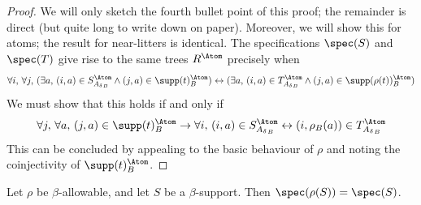 \begin{proof}
  We will only sketch the fourth bullet point of this proof; the remainder is direct (but quite long to write down on paper).
  Moreover, we will show this for atoms; the result for near-litters is identical.
  The specifications \( \spec(S) \) and \( \spec(T) \) give rise to the same trees \( R^\Atom \) precisely when
  \[ \forall i,\, \forall j,\, (\exists a,\, (i, a) \in S_{{A_\delta}_B}^\Atom \wedge (j, a) \in \supp(t)_B^\Atom) \leftrightarrow (\exists a,\, (i, a) \in T_{{A_\delta}_B}^\Atom \wedge (j, a) \in \supp(\rho(t))_B^\Atom) \]
  We must show that this holds if and only if
  \[ \forall j,\, \forall a,\, (j, a) \in \supp(t)_B^\Atom \to \forall i,\, (i, a) \in S_{{A_\delta}_B}^\Atom \leftrightarrow (i, \rho_B(a)) \in T_{{A_\delta}_B}^\Atom \]
  This can be concluded by appealing to the basic behaviour of \( \rho \) and noting the coinjectivity of \( \supp(t)_B^\Atom \).
\end{proof}
\begin{proposition}
  \label{prop:spec_smul}
  Let \( \rho \) be \( \beta \)-allowable, and let \( S \) be a \( \beta \)-support.
  Then \( \spec(\rho(S)) = \spec(S) \).
\end{proposition}
